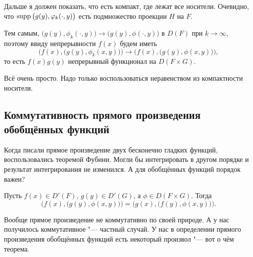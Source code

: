 Дальше я должен показать, что есть компакт, где лежат все носители. Очевидно, что $\operatorname{supp}\big(g(y),\varphi_k(\cdot,y)\big)$ есть подмножество проекции $H$ на $F$.

Тем самым, $\big(g(y),\phi_k(\cdot,y)\big)\to \big(g(y),\phi(\cdot,y)\big)$ в $D(F)$ при $k\to \infty$, поэтому ввиду непрерывности $f(x)$ будем иметь
\[\Big(f(x),\big(g(y),\phi_k(x,y)\big)\Big)\to \Big(f(x),\big(g(y),\phi(x,y)\big)\Big),\]
то есть $f(x)g(y)$ непрерывный функционал на $D(F\times G)$.

Всё очень просто. Надо только воспользоваться неравенством из компактности носителя.

\subsection{Коммутативность прямого произведения обобщённых функций}
Когда писали прямое произведение двух бесконечно гладких функций, воспользовались теоремой Фубини. Могли бы интегрировать в другом порядке и результат интегрирования не изменился. А для обобщённых функций порядок важен?
\begin{The}\label{kompramprod}
  Пусть $f(x)\in D'(F)$, $g(y)\in D'(G)$, а $\phi\in D(F\times G)$. Тогда 
\[\Big(f(x),\big(g(y),\phi(x,y)\big)\Big) = \Big(g(x),\big(f(y),\phi(x,y)\big)\Big).\]
\end{The}

Вообще прямое произведение не коммутативно по своей природе. А у нас получилось коммутативное "--- частный случай. У нас в определении прямого произведения обобщённых функций есть некоторый произвол "--- вот о чём теорема.

